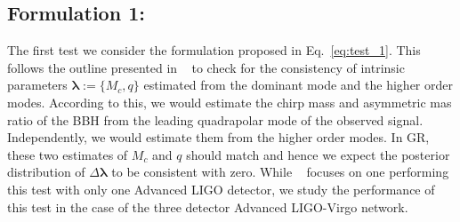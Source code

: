 \documentclass[prd,preprintnumbers,twocolumn,eqsecnum,floatfix,a4paper,nofootinbib,superscriptaddress]{revtex4}
\newcommand{\blambda}{\bm{\lambda}}
\begin{document}
\subsection{Formulation 1:}
The first test we consider the formulation proposed in Eq.~\eqref{eq:test_1}. This follows the outline presented in ~\cite{dhanpal2018} to check for the consistency of intrinsic parameters $\blambda := \{M_c, q\}$ estimated from the dominant mode and the higher order modes. According to this, we would estimate the chirp mass and asymmetric mas ratio of the BBH from the leading quadrapolar mode of the observed signal. Independently, we would estimate them from the higher order modes. In GR, these two estimates of $M_c$ and $q$ should match and hence we expect the posterior distribution of $\Delta \blambda $ to be consistent with zero. While ~\cite{dhanpal2018} focuses on one performing this test with only one Advanced LIGO detector, we study the performance of this test in the case of the three detector Advanced LIGO-Virgo network. 
\end{document}
